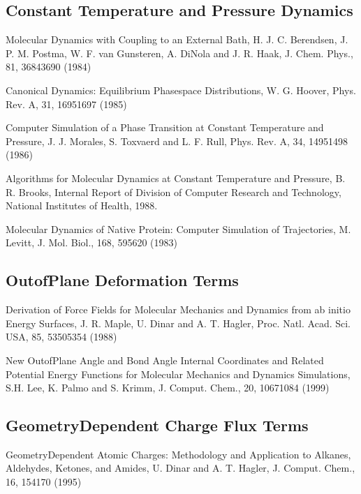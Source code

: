 \documentclass[letterpaper,11pt,english]{sphinxmanual}
\begin{document}
\subsection{Constant Temperature and Pressure Dynamics}
\label{\detokenize{text/references:constant-temperature-and-pressure-dynamics}}
\sphinxAtStartPar
Molecular Dynamics with Coupling to an External Bath, H. J. C. Berendsen, J. P. M. Postma, W. F. van Gunsteren, A. DiNola and J. R. Haak, J. Chem. Phys., 81, 3684\sphinxhyphen{}3690 (1984)

\sphinxAtStartPar
Canonical Dynamics: Equilibrium Phase\sphinxhyphen{}space Distributions, W. G. Hoover, Phys. Rev. A, 31, 1695\sphinxhyphen{}1697 (1985)

\sphinxAtStartPar
Computer Simulation of a Phase Transition at Constant Temperature and Pressure, J. J. Morales, S. Toxvaerd and L. F. Rull, Phys. Rev. A, 34, 1495\sphinxhyphen{}1498 (1986)

\sphinxAtStartPar
Algorithms for Molecular Dynamics at Constant Temperature and Pressure, B. R. Brooks, Internal Report of Division of Computer Research and Technology, National Institutes of Health, 1988.

\sphinxAtStartPar
Molecular Dynamics of Native Protein: Computer Simulation of Trajectories, M. Levitt, J. Mol. Biol., 168, 595\sphinxhyphen{}620 (1983)


\subsection{Out\sphinxhyphen{}of\sphinxhyphen{}Plane Deformation Terms}
\label{\detokenize{text/references:out-of-plane-deformation-terms}}
\sphinxAtStartPar
Derivation of Force Fields for Molecular Mechanics and Dynamics from ab initio Energy Surfaces, J. R. Maple, U. Dinar and A. T. Hagler, Proc. Natl. Acad. Sci. USA, 85, 5350\sphinxhyphen{}5354 (1988)

\sphinxAtStartPar
New Out\sphinxhyphen{}of\sphinxhyphen{}Plane Angle and Bond Angle Internal Coordinates and Related Potential Energy Functions for Molecular Mechanics and Dynamics Simulations, S.\sphinxhyphen{}H. Lee, K. Palmo and S. Krimm, J. Comput. Chem., 20, 1067\sphinxhyphen{}1084 (1999)


\subsection{Geometry\sphinxhyphen{}Dependent Charge Flux Terms}
\label{\detokenize{text/references:geometry-dependent-charge-flux-terms}}
\sphinxAtStartPar
Geometry\sphinxhyphen{}Dependent Atomic Charges: Methodology and Application to Alkanes, Aldehydes, Ketones, and Amides, U. Dinar and A. T. Hagler, J. Comput. Chem., 16, 154\sphinxhyphen{}170 (1995)
\end{document}
